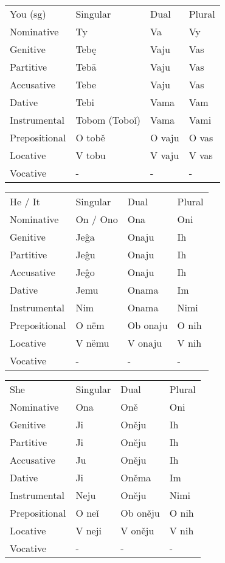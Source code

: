 \begin{table}[!htb]
	\begin{tabular}{llll}
		You (sg) & Singular & Dual & Plural \\
		Nominative & Ty & Va & Vy \\
		Genitive & Tebę & Vaju & Vas \\
		Partitive & Tebä & Vaju & Vas \\
		Accusative & Tebe & Vaju & Vas \\
		Dative & Tebi & Vama & Vam \\
		Instrumental & Tobom (Toboǐ) & Vama & Vami \\
		Prepositional & O tobě & O vaju & O vas \\
		Locative & V tobu & V vaju & V vas \\
		Vocative & - & - & -
	\end{tabular}
\end{table}

\begin{table}[!htb]
	\begin{tabular}{llll}
		He / It & Singular & Dual & Plural \\
		Nominative & On / Ono & Ona & Oni \\
		Genitive & Jeĝa & Onaju & Ih \\
		Partitive & Jeĝu & Onaju & Ih \\
		Accusative & Jeĝo & Onaju & Ih \\
		Dative & Jemu & Onama & Im \\
		Instrumental & Nim & Onama & Nimi \\
		Prepositional & O nëm & Ob onaju & O nih \\
		Locative & V nëmu & V onaju & V nih \\
		Vocative & - & - & -
	\end{tabular}
\end{table}

\begin{table}[!htb]
	\begin{tabular}{llll}
		She & Singular & Dual & Plural \\
		Nominative & Ona & Oně & Oni \\
		Genitive & Ji & Oněju & Ih \\
		Partitive & Ji & Oněju & Ih \\
		Accusative & Ju & Oněju & Ih \\
		Dative & Ji & Oněma & Im \\
		Instrumental & Neju & Oněju & Nimi \\
		Prepositional & O neǐ & Ob oněju & O nih \\
		Locative & V neji & V oněju & V nih \\
		Vocative & - & - & -
	\end{tabular}
\end{table}

